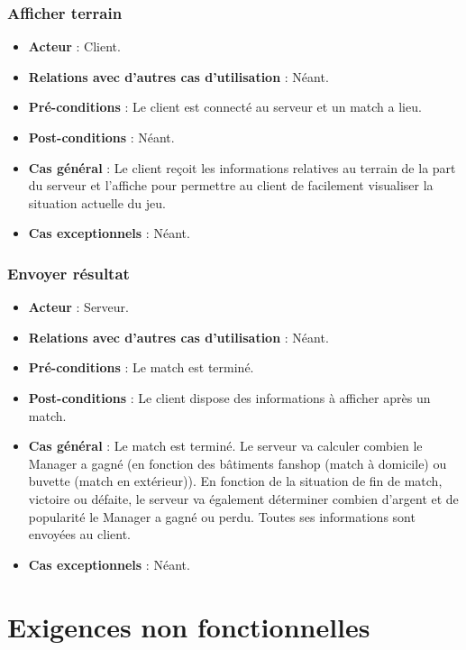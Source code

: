 \documentclass[a4paper,titlepage]{scrreprt}
\begin{document}
\begin{itemize}
    \subsubsection{Afficher terrain}
      \begin{itemize}
        \item \textbf{Acteur}  : Client.
        \item \textbf{Relations avec d'autres cas d'utilisation}  : Néant.
        \item \textbf{Pré-conditions} : Le client est connecté au serveur et un match a lieu.
        \item \textbf{Post-conditions} : Néant.
        \item \textbf{Cas général} : Le client reçoit les informations relatives au terrain de la part du serveur et l’affiche pour permettre au client de facilement visualiser la situation actuelle du jeu.
        \item \textbf{Cas exceptionnels} : Néant. 
      \end{itemize}
    \subsubsection{Envoyer résultat}
      \begin{itemize}
        \item \textbf{Acteur}  : Serveur.
        \item \textbf{Relations avec d'autres cas d'utilisation}  : Néant.
        \item \textbf{Pré-conditions} : Le match est terminé.
        \item \textbf{Post-conditions} : Le client dispose des informations à afficher après un match.
        \item \textbf{Cas général} : Le match est terminé. Le serveur va calculer combien le Manager a gagné (en fonction des bâtiments \gls{fanshop} (match à domicile) ou \gls{buvette} (match en extérieur)). En fonction de la situation de fin de match, victoire ou défaite, le serveur va également déterminer combien d’argent et de popularité le Manager a gagné ou perdu. Toutes ses informations sont envoyées au client.
        \item \textbf{Cas exceptionnels} : Néant.
      \end{itemize}




\section{Exigences non fonctionnelles}

\end{itemize}
\end{document}
